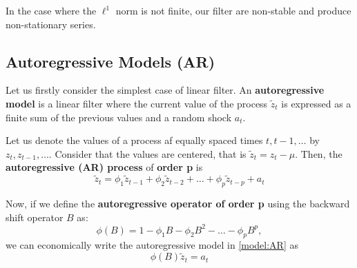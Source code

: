 In the case where the \(\ell^{1}\) norm is not finite, our filter are non-stable and produce non-stationary series.

\subsection{Autoregressive Models (AR)}

Let us firstly consider the simplest case of linear filter. An \textbf{autoregressive model} is a linear filter where the current value of the process \(\tilde z_{t}\) is expressed as a finite sum of the previous values and a random shock \(a_{t}\).

\begin{ndef}
  Let us denote the values of a process af equally spaced times \(t,t-1,\dots\) by \(z_{t}, z_{t-1}, \dots\). Consider that the values are centered, that is \(\tilde z_{t} = z_{t} - \mu\). Then, the \textbf{autoregressive (AR) process} of \textbf{order p} is
  \begin{equation}\label{model:AR}
    \tilde z_{t} = \phi_{1}\tilde z_{t-1} + \phi_{2}\tilde z_{t-2}+ \dots  + \phi_{p}\tilde z_{t-p} + a_{t}
    \end{equation}
\end{ndef}

Now, if we define the \textbf{autoregressive operator of order p} using the backward shift operator \(B\) as:
\[
\phi(B) = 1- \phi_{1}B - \phi_{2}B^{2} - \dots - \phi_{p}B^{p},
\]
we can economically write the autoregressive model in \eqref{model:AR} as
\begin{equation}\label{model:ar:red}
  \phi(B)\tilde z_{t} = a_{t}
\end{equation}
